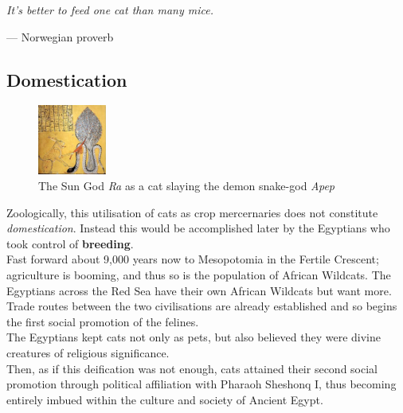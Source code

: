 \documentclass{article}
\begin{document}
\begin{flushright}
\begin{minipage}{8cm}
    \begin{flushleft}
        \emph{It's better to feed one cat than many mice.}
    \end{flushleft}
    \begin{flushright}--- Norwegian proverb\end{flushright}
\end{minipage}
\end{flushright}

\subsection*{Domestication}

\begin{figure}
    \centering
    \includegraphics[width=0.20\textwidth]{img/apep-cat.png}
    \caption{The Sun God \emph{Ra} as a cat slaying the demon snake-god \emph{Apep}}
\end{figure}

Zoologically, this utilisation of cats as crop mercernaries does not constitute \emph{domestication}. Instead this would be accomplished later by the Egyptians who took control of \textbf{breeding}.\\

Fast forward about 9,000 years now to Mesopotomia in the Fertile Crescent; agriculture is booming, and thus so is the population of African Wildcats. The Egyptians across the Red Sea have their own African Wildcats but want more. Trade routes between the two civilisations are already established and so begins the first social promotion of the \gls{feline}s.\\

The Egyptians kept cats not only as pets, but also believed they were divine creatures of religious significance.\\

Then, as if this deification was not enough, cats attained their second social promotion through political affiliation with Pharaoh Sheshonq I, thus becoming entirely imbued within the culture and society of Ancient Egypt.
\end{document}
